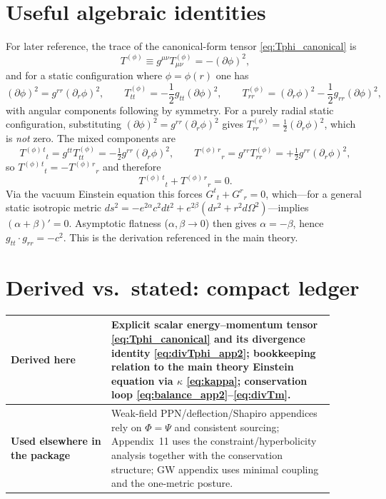 \documentclass[11pt]{article}
\begin{document}
\section{Useful algebraic identities}\label{sec:ids}
For later reference, the trace of the canonical-form tensor \eqref{eq:Tphi_canonical} is
\begin{equation}
T^{(\phi)}\equiv g^{\mu\nu}T^{(\phi)}_{\mu\nu}= -(\partial\phi)^2,
\end{equation}
and for a static configuration where $\phi=\phi(r)$ one has
\begin{equation}
(\partial\phi)^2=g^{rr}(\partial_r\phi)^2,
\qquad
T^{(\phi)}_{tt}=-\frac12 g_{tt}(\partial\phi)^2,
\qquad
T^{(\phi)}_{rr}=(\partial_r\phi)^2-\frac12 g_{rr}(\partial\phi)^2,
\end{equation}
with angular components following by symmetry.
For a purely radial static configuration, substituting
$(\partial\phi)^2=g^{rr}(\partial_r\phi)^2$ gives
$T^{(\phi)}_{rr}=\frac12(\partial_r\phi)^2$,
which is \emph{not} zero.  The mixed components are
\begin{equation}
T^{(\phi)\,t}{}_{t}
  =g^{tt}T^{(\phi)}_{tt}=-\tfrac12 g^{rr}(\partial_r\phi)^2,
\qquad
T^{(\phi)\,r}{}_{r}
  =g^{rr}T^{(\phi)}_{rr}=+\tfrac12 g^{rr}(\partial_r\phi)^2,
\end{equation}
so $T^{(\phi)\,t}{}_{t}=-T^{(\phi)\,r}{}_{r}$
and therefore
\begin{equation}\label{eq:sum_identity}
T^{(\phi)\,t}{}_{t}+T^{(\phi)\,r}{}_{r}=0.
\end{equation}
Via the vacuum Einstein equation this forces
$G^{t}{}_{t}+G^{r}{}_{r}=0$,
which---for a general static isotropic metric
$ds^{2}=-e^{2\alpha}c^{2}dt^{2}+e^{2\beta}(dr^{2}+r^{2}d\Omega^{2})$---implies
$(\alpha+\beta)'=0$.
Asymptotic flatness ($\alpha,\beta\to0$) then gives
$\alpha=-\beta$, hence $g_{tt}\cdot g_{rr}=-c^{2}$.
This is the derivation referenced in the main theory.
\section{Derived vs.\ stated: compact ledger}\label{sec:ledger_app2}
\begin{center}
\begin{tabular}{@{}p{0.28\linewidth}p{0.62\linewidth}@{}}
\toprule
\textbf{Derived here} &
Explicit scalar energy--momentum tensor \eqref{eq:Tphi_canonical} and its divergence identity \eqref{eq:divTphi_app2}; bookkeeping relation to the main theory Einstein equation via $\kappa$ \eqref{eq:kappa}; conservation loop \eqref{eq:balance_app2}--\eqref{eq:divTm}.\\
\midrule
\textbf{Used elsewhere in the package} &
Weak-field PPN/deflection/Shapiro appendices rely on $\Phi=\Psi$ and consistent sourcing; Appendix~11 uses the constraint/hyperbolicity analysis together with the conservation structure; GW appendix uses minimal coupling and the one-metric posture.\\
\bottomrule
\end{tabular}
\end{center}
\end{document}
